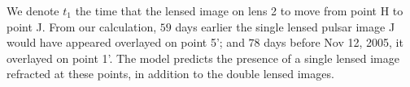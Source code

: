 \documentclass[useAMS,usenatbib]{mn2e}
\begin{document}
We denote $t_1$ the time that the lensed image on lens 2 to move from point
H to point J. From our calculation, $59$ days earlier the
single lensed pulsar image  J would have appeared overlayed on point
5'; and $78$ days 
before Nov 12, 2005, it overlayed on point 1'. The
model predicts the presence of a single lensed image refracted at
these points, in addition to the double lensed images.


\end{document}
